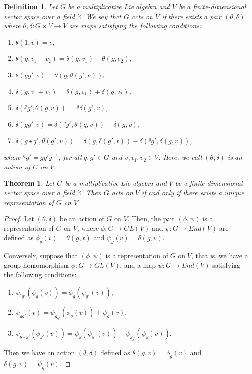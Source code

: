 \documentclass[10 pt,oneside,reqno,a4paper]{amsart}
\newtheorem{theorem}{Theorem}[section]
\newtheorem{definition}{Definition}[section]
\numberwithin{equation}{section}
\begin{document}
\begin{definition}
    Let $G$ be a multiplicative Lie algebra and $V$ be a finite-dimensional vector space over a field $\mathbb{K}$. We say that $G$ acts on $V$ if there exists a pair $ (\theta, \delta)$ where 
$\theta, \delta: G\times V \to V$ are maps satisfying the following conditions:
\begin{enumerate}
\item $\theta(1, v) = v$,
\item  $\theta(g, v_1 +v_2) = \theta(g, v_1 )+ \theta(g, v_2)$,
\item  $\theta(gg', v) = \theta(g, \theta(g', v) )$,
\item $\delta(g,v_1+v_2)=\delta({g}, v_1) + \delta(g,v_2)$,
\item  $\delta({^gg'}, \theta(g, v)) =~  ^g{\delta({g'}, {v})}$,
    \item $\delta(gg',v)=\delta({^gg'}, \theta(g, v)) + \delta(g,v)$,
    \item $\delta(g \star g', \theta(g', v))= \delta(g,\delta(g',v)) - \delta({^gg'},\delta(g,v))$,
\end{enumerate} 
where  $^gg'=gg'g^{-1}$, for all $g,g' \in G$ and $v, v_1, v_2\in V$. Here, we call $ (\theta, \delta)$ is an action  of $G$ on $V$.
\end{definition}

\begin{theorem}
    Let $G$ be a multiplicative Lie algebra and $V$ be a finite-dimensional vector space over a field $\mathbb{K}$. Then  $G$ acts on $V$ if and only if there exists a unique representation of $G$ on $V$. 
\end{theorem}
\begin{proof}
  Let $ (\theta, \delta)$ be an action  of $G$ on $V$. Then, the pair $(\phi,\psi)$ is a representation of $G$ on $V$, where $\phi: G \to GL(V)$ and $\psi: G \to End(V)$ are defined as $\phi_g(v)= \theta(g,v)$ and $\psi_g(v)= \delta(g,v)$.

     Conversely, suppose that $(\phi,\psi)$ is a representation of $G$ on $V$, that is, we have a group homomorphism $\phi : G\to GL(V)$, and a map $\psi : G \to End(V)$ satisfying the following conditions:
\begin{enumerate}
\item $\psi_{^g{g'}}(\phi_g(v)) = \phi_g(\psi_{{g'}}(v))$,
    \item $\psi_{gg'}(v)= \psi_{g_{g'}}(\phi_g(v)) + \psi_g(v)$,
    \item $\psi_{g \star g'}(\phi_{g'}(v))=\psi_{g}(\psi_{g'}(v))- \psi_{g_{g'}}(\psi_g(v))$.
\end{enumerate} Then we have an action $(\theta, \delta)$ defined as $\theta(g,v)= \phi_g(v)$ and $\delta(g,v)= \psi_g(v)$.
\end{proof}
\end{document}
